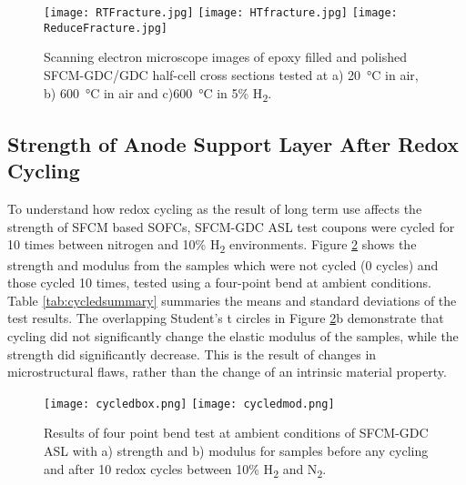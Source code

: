         \begin{figure}
          \texttt{[image: RTFracture.jpg]}
          \texttt{[image: HTfracture.jpg]}
          \texttt{[image: ReduceFracture.jpg]}
          \caption{Scanning electron microscope images of epoxy filled and polished SFCM-GDC/GDC half-cell cross sections tested at a) \SI{20}{\celsius} in air, b) \SI{600}{\celsius} in air and c)\SI{600}{\celsius} in 5\% H\textsubscript{2}.}
          \label{fig:InSituSEM}
        \end{figure}

    \subsection{Strength of Anode Support Layer After Redox Cycling}
        To understand how redox cycling as the result of long term use affects the strength of SFCM based SOFCs, SFCM-GDC ASL test coupons were cycled for 10 times between nitrogen and 10\% H\textsubscript{2} environments.
        Figure \ref{fig:cycledbox} shows the strength and modulus from the samples which were not cycled (0 cycles) and those cycled 10 times, tested using a four-point bend at ambient conditions.
        Table \ref{tab:cycledsummary} summaries the means and standard deviations of the test results.
        The overlapping Student's t circles in Figure \ref{fig:cycledbox}b demonstrate that cycling did not significantly change the elastic modulus of the samples, while the strength did significantly decrease.
        This is the result of changes in microstructural flaws, rather than the change of an intrinsic material property.

        \begin{figure}
          \texttt{[image: cycledbox.png]}
          \texttt{[image: cycledmod.png]}
          \caption{Results of four point bend test at ambient conditions of SFCM-GDC ASL with a) strength and b) modulus for samples before any cycling and after 10 redox cycles between 10\% H\textsubscript{2} and N\textsubscript{2}.}
          \label{fig:cycledbox}
        \end{figure}

